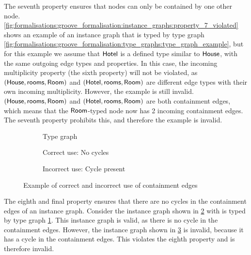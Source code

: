 The seventh property ensures that nodes can only be contained by one other node. \cref{fig:formalisations:groove_formalisation:instance_graphs:property_7_violated} shows an example of an instance graph that is typed by type graph \cref{fig:formalisations:groove_formalisation:type_graphs:type_graph_example}, but for this example we assume that $\mathsf{Hotel}$ is a defined type similar to $\mathsf{House}$, with the same outgoing edge types and properties. In this case, the incoming multiplicity property (the sixth property) will not be violated, as $( \mathsf{House}, \mathsf{rooms}, \mathsf{Room} )$ and $( \mathsf{Hotel}, \mathsf{rooms}, \mathsf{Room} )$ are different edge types with their own incoming multiplicity. However, the example is still invalid. $( \mathsf{House}, \mathsf{rooms}, \mathsf{Room} )$ and $( \mathsf{Hotel}, \mathsf{rooms}, \mathsf{Room} )$ are both containment edges, which means that the $\mathsf{Room}$-typed node now has 2 incoming containment edges. The seventh property prohibits this, and therefore the example is invalid.

\begin{figure}[p]
    \centering
    \begin{subfigure}{0.3\textwidth}
        \centering
        
        \caption{Type graph}
        \label{fig:formalisations:groove_formalisation:instance_graphs:property_8_violated:type_graph}
    \end{subfigure}
    \begin{subfigure}{0.3\textwidth}
        \centering
        
        \caption{Correct use: No cycles}
        \label{fig:formalisations:groove_formalisation:instance_graphs:property_8_violated:correct_instance_graph}
    \end{subfigure}
    \begin{subfigure}{0.3\textwidth}
        \centering
        
        \caption{Incorrect use: Cycle present}
        \label{fig:formalisations:groove_formalisation:instance_graphs:property_8_violated:invalid_instance_graph}
    \end{subfigure}
    \caption{Example of correct and incorrect use of containment edges}
    \label{fig:formalisations:groove_formalisation:instance_graphs:property_8_violated}
\end{figure}

The eighth and final property ensures that there are no cycles in the containment edges of an instance graph. Consider the instance graph shown in \cref{fig:formalisations:groove_formalisation:instance_graphs:property_8_violated:correct_instance_graph} with is typed by type graph \cref{fig:formalisations:groove_formalisation:instance_graphs:property_8_violated:type_graph}. This instance graph is valid, as there is no cycle in the containment edges. However, the instance graph shown in \cref{fig:formalisations:groove_formalisation:instance_graphs:property_8_violated:invalid_instance_graph} is invalid, because it has a cycle in the containment edges. This violates the eighth property and is therefore invalid.